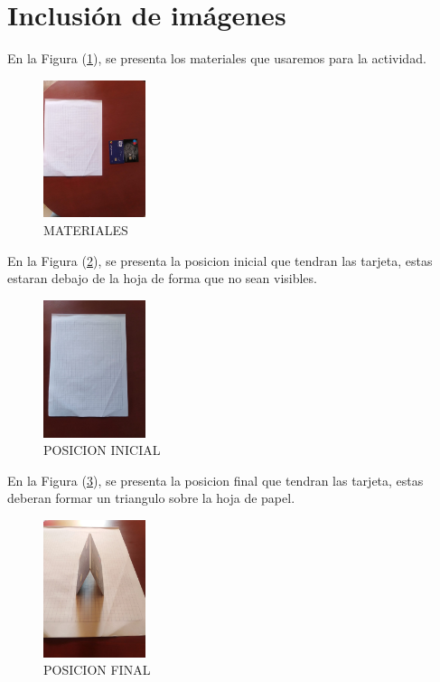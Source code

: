\documentclass{article}
\begin{document}
\section{Inclusión de imágenes} \label{imagenes}

En la Figura (\ref{fig:Materiales}), se presenta los materiales que usaremos para la actividad.

\begin{figure}[h]
\includegraphics[width=3cm]{MATERIALES.jpeg}
\centering
\caption{MATERIALES}
\label{fig:Materiales}
\end{figure}

En la Figura (\ref{fig:POSICION INICIAL}), se presenta la posicion inicial que tendran las tarjeta, estas estaran debajo de la hoja de forma que no sean visibles.

\begin{figure}[h]
\includegraphics[width=3cm]{POSICION INICIAL.jpeg}
\centering
\caption{POSICION INICIAL}
\label{fig:POSICION INICIAL}
\end{figure}

En la Figura (\ref{fig:POSICION FINAL}), se presenta la posicion final que tendran las tarjeta, estas deberan formar un triangulo sobre la hoja de papel.

\begin{figure}[h]
\includegraphics[width=3cm]{POSICION FINAL.jpeg}
\centering
\caption{POSICION FINAL}
\label{fig:POSICION FINAL}
\end{figure}



\end{document}

